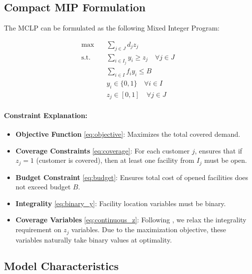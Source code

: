 \documentclass[11pt,a4paper]{article}
\begin{document}
\subsection{Compact MIP Formulation}

The MCLP can be formulated as the following Mixed Integer Program:

\begin{subequations}
\begin{align}
  \max \quad & \sum_{j \in J} d_j z_j \label{eq:objective} \\
  \text{s.t.} \quad & \sum_{i \in I_j} y_i \geq z_j \quad \forall j \in J \label{eq:coverage} \\
  & \sum_{i \in I} f_i y_i \leq B \label{eq:budget} \\
  & y_i \in \{0,1\} \quad \forall i \in I \label{eq:binary_y} \\
  & z_j \in [0,1] \quad \forall j \in J \label{eq:continuous_z}
\end{align}
\end{subequations}

\paragraph{Constraint Explanation:}
\begin{itemize}
  \item \textbf{Objective Function} \eqref{eq:objective}: Maximizes the total covered demand.
  
  \item \textbf{Coverage Constraints} \eqref{eq:coverage}: For each customer $j$, ensures that if $z_j = 1$ (customer is covered), then at least one facility from $I_j$ must be open.
  
  \item \textbf{Budget Constraint} \eqref{eq:budget}: Ensures total cost of opened facilities does not exceed budget $B$.
  
  \item \textbf{Integrality} \eqref{eq:binary_y}: Facility location variables must be binary.
  
  \item \textbf{Coverage Variables} \eqref{eq:continuous_z}: Following \cite{cordeau2019}, we relax the integrality requirement on $z_j$ variables. Due to the maximization objective, these variables naturally take binary values at optimality.
\end{itemize}

\subsection{Model Characteristics}
\end{document}
